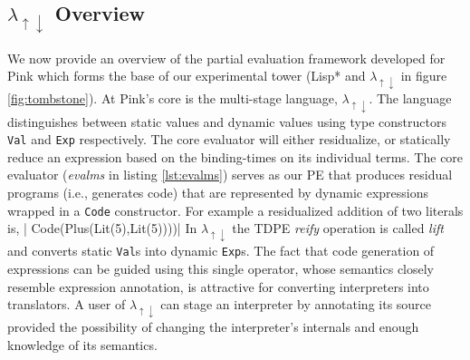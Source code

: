 \documentclass[a4paper,12pt,twoside,openright]{report}
\theoremstyle{definition}
\newcommand{\mslang}{$\lambda_{\uparrow\downarrow}$}
\begin{document}
%

\subsection{\texorpdfstring{\mslang}{Lg} Overview}\label{subsec:mslang}
We now provide an overview of the partial evaluation framework developed for Pink \cite{amin2017collapsing} which forms the base of our experimental tower (Lisp* and \mslang{} in figure \ref{fig:tombstone}). At Pink's core is the multi-stage language, \mslang{}. The language distinguishes between static values and dynamic values using type constructors \texttt{Val} and \texttt{Exp} respectively. The core evaluator will either residualize, or statically reduce an expression based on the binding-times on its individual terms. The core evaluator (\textit{evalms} in listing \ref{lst:evalms}) serves as our PE that produces residual programs (i.e., generates code) that are represented by dynamic expressions wrapped in a \texttt{Code} constructor. For example a residualized addition of two literals is,
|    Code(Plus(Lit(5),Lit(5))))|
In \mslang{} the TDPE \textit{reify} operation is called \textit{lift} and converts static \texttt{Val}s into dynamic \texttt{Exp}s. The fact that code generation of expressions can be guided using this single operator, whose semantics closely resemble expression annotation, is attractive for converting interpreters into translators. A user of \mslang{} can stage an interpreter by annotating its source provided the possibility of changing the interpreter's internals and enough knowledge of its semantics.
\newline
\end{document}

